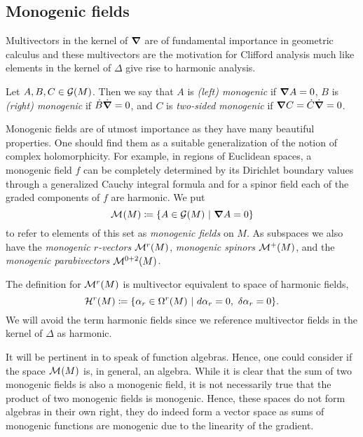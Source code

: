 \subsection{Monogenic fields}
Multivectors in the kernel of $\boldsymbol{\nabla}$ are of fundamental importance in geometric calculus and these multivectors are the motivation for Clifford analysis much like elements in the kernel of $\Delta$ give rise to harmonic analysis. 
\begin{definition}
 Let $A,B,C \in \mathcal{G}(M)$. Then we say that $A$ is \emph{(left) monogenic} if $\boldsymbol{\nabla} A =0$, $B$ is \emph{(right) monogenic} if $\dot{B}\dot{\boldsymbol{\nabla}} = 0$, and $C$ is \emph{two-sided monogenic} if $\boldsymbol{\nabla} C = \dot{C}\dot{\boldsymbol{\nabla}} = 0$.
\end{definition}

Monogenic fields are of utmost importance as they have many beautiful properties. One should find them as a suitable generalization of the notion of complex holomorphicity. For example, in regions of Euclidean spaces, a monogenic field $f$ can be completely determined by its Dirichlet boundary values through a generalized Cauchy integral formula and for a spinor field each of the graded components of $f$ are harmonic. We put 
\[
\mathcal{M}^{}(M)\coloneqq \{A \in \mathcal{G}(M) ~\vert~ \boldsymbol{\nabla} A =0\}
\]
to refer to elements of this set as \emph{monogenic fields} on $M$. As subspaces we also have the \emph{monogenic $r$-vectors} $\mathcal{M}^{r}(M)$, \emph{monogenic spinors} $\mathcal{M}^{+}(M)$, and the \emph{monogenic parabivectors} $\mathcal{M}^{0+2}(M)$. 

\begin{remark}
The definition for $\mathcal{M}^{r}(M)$ is multivector equivalent to space of harmonic fields,
    \begin{equation}
        \mathcal{H}^{r}(M)\coloneqq \{\alpha_r \in \Omega^{r}(M) ~\vert~ d \alpha_r = 0, ~ \delta \alpha_r = 0\}.
    \end{equation}
We will avoid the term harmonic fields since we reference multivector fields in the kernel of $\Delta$ as harmonic.
\end{remark}

It will be pertinent in  to speak of function algebras. Hence, one could consider if the space $\mathcal{M}^{}(M)$ is, in general, an algebra. While it is clear that the sum of two monogenic fields is also a monogenic field, it is not necessarily true that the product of two monogenic fields is monogenic. Hence, these spaces do not form algebras in their own right, they do indeed form a vector space as sums of monogenic functions are monogenic due to the linearity of the gradient. 

